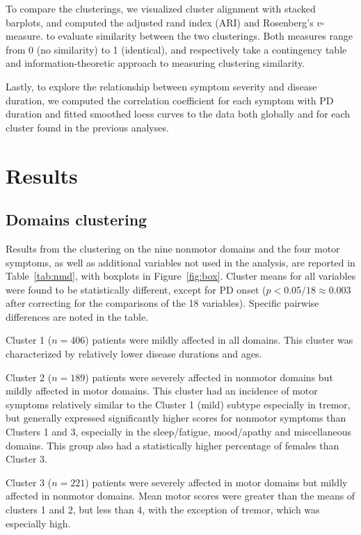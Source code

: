 \documentclass[preprint,5p]{elsarticle} %
\begin{document}
To compare the clusterings, we visualized cluster alignment with stacked barplots, and computed the adjusted rand index\cite{hubert1985} (ARI) and
Rosenberg's $v$-measure.\cite{rosenberg07vmeasure} to evaluate similarity between the two
clusterings. Both measures range from 0 (no similarity) to 1 (identical), and respectively take a
contingency table and information-theoretic approach to measuring clustering similarity.

Lastly, to explore the relationship between symptom severity and disease duration, we computed the
correlation coefficient for each symptom with PD duration and fitted smoothed loess curves to the
data both globally and for each cluster found in the previous analyses.

\section{Results}

\subsection{Domains clustering}

Results from the clustering on the nine nonmotor domains and the four motor symptoms, as well as
additional variables not used in the analysis, are reported in Table~\ref{tab:nmd}, with boxplots
in Figure~\ref{fig:box}.
Cluster means for all variables were found to be statistically different, except for PD onset ($p <
0.05 / 18 \approx 0.003$ after correcting for the comparisons of the 18 variables). Specific
pairwise differences are noted in the table.

Cluster 1 ($n = 406$) patients were mildly affected in all domains. This cluster was characterized
by relatively lower disease durations and ages.

Cluster 2 ($n = 189$) patients were severely affected in nonmotor domains but mildly affected in
motor domains. This cluster had an incidence of motor symptoms relatively similar to the Cluster 1
(mild) subtype especially in tremor, but generally expressed significantly higher scores for
nonmotor symptoms than Clusters 1 and 3, especially in the sleep/fatigue, mood/apathy and
miscellaneous domains. This group also had a statistically higher percentage of females than
Cluster 3.

Cluster 3 ($n = 221$) patients were severely affected in motor domains but mildly affected in
nonmotor domains. Mean motor scores were greater than the means of clusters 1 and 2, but less than
4, with the exception of tremor, which was especially high.
\end{document}

